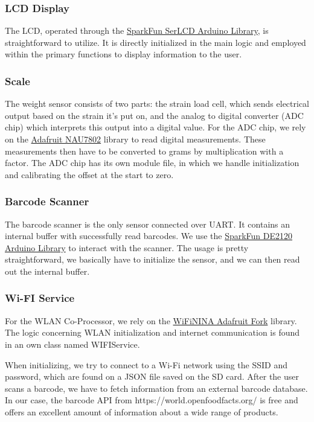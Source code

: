 \documentclass{article}
\begin{document}
\subsubsection{LCD Display}
The LCD, operated through the \href{https://github.com/sparkfun/SparkFun_SerLCD_Arduino_Library}{SparkFun SerLCD Arduino Library}, is straightforward to utilize. It is directly initialized in the main logic and employed within the primary functions to display information to the user.

\subsubsection{Scale}
The weight sensor consists of two parts: the strain load cell, which sends electrical output based on the strain it's put on, and the analog to digital converter (ADC chip) which interprets this output into a digital value.
For the ADC chip, we rely on the \href{https://github.com/adafruit/Adafruit_NAU7802}{Adafruit NAU7802} library to read digital measurements.
These measurements then have to be converted to grams by multiplication with a factor.
The ADC chip has its own module file, in which we handle initialization and calibrating the offset at the start to zero.

\subsubsection{Barcode Scanner}
The barcode scanner is the only sensor connected over UART. It contains an internal buffer with successfully read barcodes.
We use the \href{https://github.com/sparkfun/SparkFun_DE2120_Arduino_Library}{SparkFun DE2120 Arduino Library} to interact with the scanner.
The usage is pretty straightforward, we basically have to initialize the sensor, and we can then read out the internal buffer.

\subsubsection{Wi-FI Service}
For the WLAN Co-Processor, we rely on the \href{https://github.com/adafruit/WiFiNINA}{WiFiNINA Adafruit Fork} library.
The logic concerning WLAN initialization and internet communication is found in an own class named WIFIService.

When initializing, we try to connect to a Wi-Fi network using the SSID and password, which are found on a JSON file saved on the SD card.
After the user scans a barcode, we have to fetch information from an external barcode database. In our case, the barcode API from https://world.openfoodfacts.org/ is free and offers an excellent amount of information about a wide range of products.
\end{document}

